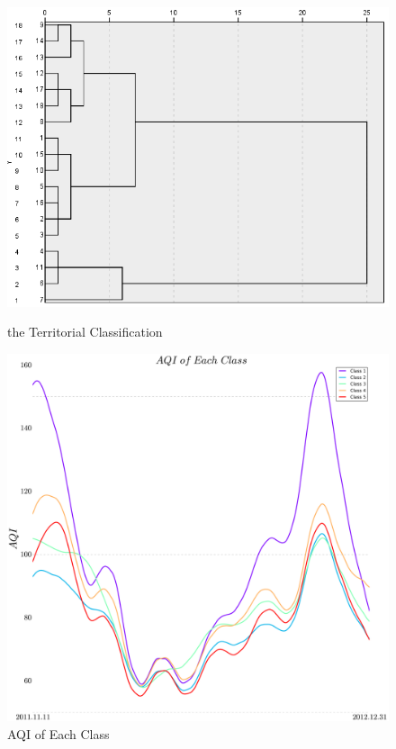\documentclass[a4paper,11pt]{article}
\begin{document}
\begin{figure}[h]
  \centering %
  \begin{minipage}[t]{.4\linewidth}
\centering %
\includegraphics[width=1.0\textwidth]{./Pic/5class1.png}
\caption{the Territorial Classification}
\label{fig:5class1}  
  \end{minipage}
  \begin{minipage}[t]{.4\linewidth}
  
  \centering %
\includegraphics[width=1.0\textwidth]{./Pic/5class2.png}
\caption{AQI of Each Class}
\label{fig:5class2}  
  \end{minipage}
\end{figure}
\end{document}
